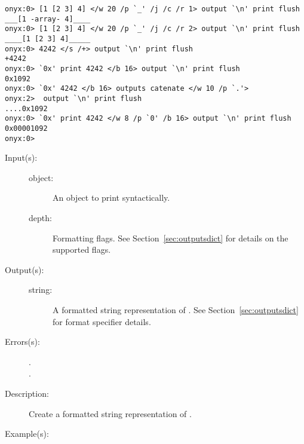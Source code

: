 \begin{description}
\begin{description}
\begin{verbatim}
onyx:0> [1 [2 3] 4] </w 20 /p `_' /j /c /r 1> output `\n' print flush
___[1 -array- 4]____
onyx:0> [1 [2 3] 4] </w 20 /p `_' /j /c /r 2> output `\n' print flush
____[1 [2 3] 4]_____
onyx:0> 4242 </s /+> output `\n' print flush
+4242
onyx:0> `0x' print 4242 </b 16> output `\n' print flush
0x1092
onyx:0> `0x' 4242 </b 16> outputs catenate </w 10 /p `.'>
onyx:2>  output `\n' print flush
....0x1092
onyx:0> `0x' print 4242 </w 8 /p `0' /b 16> output `\n' print flush
0x00001092
onyx:0>
		\end{verbatim}
	\end{description}
\label{systemdict:outputs}
\item[{\onyxop{object flags}{outputs}{string}}: ]
	\begin{description}\item[]
	\item[Input(s): ]
		\begin{description}\item[]
		\item[object: ]
			An object to print syntactically.
		\item[depth: ]
			Formatting flags.  See Section~\ref{sec:outputsdict} for
			details on the supported flags.
		\end{description}
	\item[Output(s): ]
		\begin{description}\item[]
		\item[string: ]
			A formatted string representation of .
			See Section~\ref{sec:outputsdict} for format specifier
			details.
		\end{description}
	\item[Errors(s): ]
		\begin{description}\item[]
		\item[.]
		\item[.]
		\end{description}
	\item[Description: ]
		Create a formatted string representation of .
	\item[Example(s): ]\begin{verbatim}


\end{verbatim}
\end{description}
\end{description}

